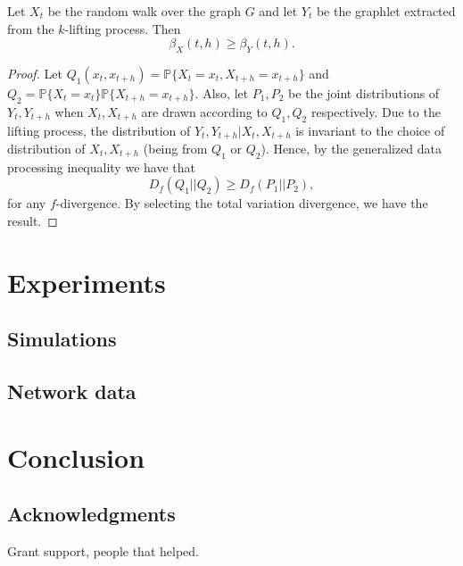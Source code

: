 \begin{theorem}
  Let $X_t$ be the random walk over the graph $G$ and let $Y_{t}$ be the graphlet extracted from the $k$-lifting process.
  Then
  \begin{equation}
    \mathbb \beta_X(t,h) \ge \mathbb \beta_Y(t,h).
  \end{equation}
\end{theorem}

\begin{proof}
  Let $Q_1 ( x_t, x_{t+h} ) = \mathbb P \{ X_t = x_t, X_{t+h} = x_{t+h} \}$ and $Q_2 = \mathbb P \{ X_t = x_t\} \mathbb P\{X_{t+h} = x_{t+h}\}$.
  Also, let $P_1, P_2$ be the joint distributions of $Y_t, Y_{t+h}$ when $X_t, X_{t+h}$ are drawn according to $Q_1,Q_2$ respectively.
  Due to the lifting process, the distribution of $Y_t, Y_{t+h} | X_t, X_{t+h}$ is invariant to the choice of distribution of $X_t, X_{t+h}$ (being from $Q_1$ or $Q_2$).
  Hence, by the generalized data processing inequality we have that
  \begin{equation*}
    D_f(Q_1 || Q_2) \ge D_f(P_1 || P_2),
  \end{equation*}
  for any $f$-divergence.
  By selecting the total variation divergence, we have the result.
\end{proof}


\section{Experiments}

\subsection{Simulations}

\subsection{Network data}

\section{Conclusion}

\subsection*{Acknowledgments}

Grant support, people that helped.
	
